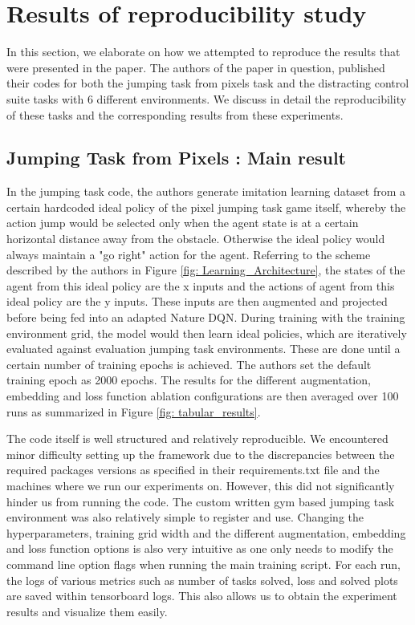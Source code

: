 \documentclass{usiinftr}
\begin{document}
\section{Results of reproducibility study}
In this section, we elaborate on how we attempted to reproduce the results that were presented in the paper. The authors of the paper in question, published their codes for both the jumping task from pixels task and the distracting control suite tasks with 6 different environments. We discuss in detail the reproducibility of these tasks and the corresponding results from these experiments.

\subsection{Jumping Task from Pixels : Main result}
In the jumping task code, the authors generate imitation learning dataset from a certain hardcoded ideal policy of the pixel jumping task game itself, whereby the action jump would be selected only when the agent state is at a certain horizontal distance away from the obstacle. Otherwise the ideal policy would always maintain a "go right" action for the agent. Referring to the scheme described by the authors in Figure \ref{fig: Learning_Architecture}, the states of the agent from this ideal policy are the x inputs and the actions of agent from this ideal policy are the y inputs. These inputs are then augmented and projected before being fed into an adapted Nature DQN. During training with the training environment grid, the model would then learn ideal policies, which are iteratively evaluated against evaluation jumping task environments. These are done until a certain number of training epochs is achieved. The authors set the default training epoch as 2000 epochs. The results for the different augmentation, embedding and loss function ablation configurations are then averaged over 100 runs as summarized in Figure \ref{fig: tabular_results}.

The code itself is well structured and relatively reproducible. We encountered minor difficulty setting up the framework due to the discrepancies between the required packages versions as specified in their requirements.txt file and the machines where we run our experiments on. However, this did not significantly hinder us from running the code. The custom written gym based jumping task environment was also relatively simple to register and use. Changing the hyperparameters, training grid width and the different augmentation, embedding and loss function options is also very intuitive as one only needs to modify the command line option flags when running the main training script. For each run, the logs of various metrics such as number of tasks solved, loss and solved plots are saved within tensorboard logs. This also allows us to obtain the experiment results and visualize them easily. 
\end{document}
